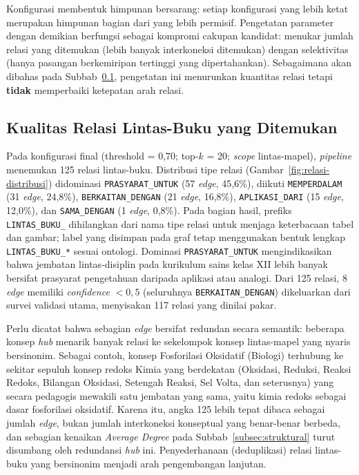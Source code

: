 \documentclass[../../thesis]{subfiles}
\begin{document}
Konfigurasi membentuk himpunan bersarang: setiap konfigurasi yang lebih
ketat merupakan himpunan bagian dari yang lebih permisif. Pengetatan
parameter dengan demikian berfungsi sebagai kompromi cakupan kandidat:
menukar jumlah relasi yang ditemukan (lebih banyak interkoneksi ditemukan) dengan
selektivitas (hanya pasangan berkemiripan tertinggi yang dipertahankan).
Sebagaimana akan dibahas pada Subbab~\ref{subsubsec:kualitas}, pengetatan ini menurunkan
kuantitas relasi tetapi \textbf{tidak} memperbaiki ketepatan arah relasi.

\subsection{Kualitas Relasi Lintas-Buku yang Ditemukan}\label{subsubsec:kualitas}

Pada konfigurasi final (threshold = 0{,}70; top-$k$ = 20; \textit{scope}
lintas-mapel), \textit{pipeline} menemukan 125 relasi lintas-buku. Distribusi
tipe relasi (Gambar~\ref{fig:relasi-distribusi}) didominasi
\texttt{PRASYARAT\_\allowbreak UNTUK} (57 \textit{edge}, 45{,}6\%), diikuti
\texttt{MEMPERDALAM} (31 \textit{edge}, 24{,}8\%),
\texttt{BERKAITAN\_\allowbreak DENGAN} (21 \textit{edge}, 16{,}8\%),
\texttt{APLIKASI\_\allowbreak DARI} (15 \textit{edge}, 12{,}0\%), dan
\texttt{SAMA\_\allowbreak DENGAN} (1 \textit{edge}, 0{,}8\%).
Pada bagian hasil, prefiks \texttt{LINTAS\_BUKU\_} dihilangkan dari nama tipe
relasi untuk menjaga keterbacaan tabel dan gambar; label yang disimpan pada
graf tetap menggunakan bentuk lengkap \texttt{LINTAS\_BUKU\_*} sesuai ontologi.
Dominasi \texttt{PRASYARAT\_\allowbreak UNTUK} mengindikasikan bahwa jembatan lintas-disiplin
pada kurikulum sains kelas XII lebih banyak bersifat prasyarat pengetahuan
daripada aplikasi atau analogi. Dari 125 relasi, 8 \textit{edge} memiliki \textit{confidence}
$< 0{,}5$ (seluruhnya \texttt{BERKAITAN\_\allowbreak DENGAN}) dikeluarkan dari survei validasi
utama, menyisakan 117 relasi yang dinilai pakar.

Perlu dicatat bahwa sebagian \textit{edge} bersifat redundan secara semantik:
beberapa konsep \emph{hub} menarik banyak relasi ke sekelompok konsep
lintas-mapel yang nyaris bersinonim. Sebagai contoh, konsep Fosforilasi
Oksidatif (Biologi) terhubung ke sekitar sepuluh konsep redoks Kimia yang
berdekatan (Oksidasi, Reduksi, Reaksi Redoks, Bilangan Oksidasi, Setengah
Reaksi, Sel Volta, dan seterusnya) yang secara pedagogis mewakili satu jembatan
yang sama, yaitu kimia redoks sebagai dasar fosforilasi oksidatif. Karena itu,
angka 125 lebih tepat dibaca sebagai jumlah \textit{edge}, bukan jumlah
interkoneksi konseptual yang benar-benar berbeda, dan sebagian kenaikan
\textit{Average Degree} pada Subbab~\ref{subsec:struktural} turut disumbang oleh
redundansi \textit{hub} ini. Penyederhanaan (deduplikasi) relasi lintas-buku
yang bersinonim menjadi arah pengembangan lanjutan.
\end{document}

